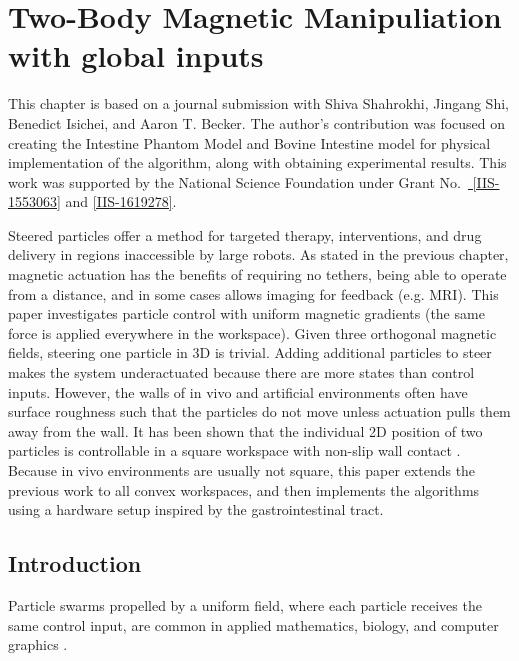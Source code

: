 \chapter[Two-Body Magnetic Manipulation with global inputs]{Two-Body Magnetic Manipuliation with global inputs}\label{chap-wallFriction}



This chapter is based on a journal submission with  Shiva Shahrokhi, Jingang Shi,  Benedict Isichei, and Aaron T. Becker.
The author's contribution was focused on creating the Intestine Phantom Model and Bovine Intestine model for physical implementation of the algorithm, along with obtaining experimental results. 
This work was supported by the National Science Foundation under Grant No.\ \href{http://nsf.gov/awardsearch/showAward?AWD_ID=1553063}{ [IIS-1553063]} and \href{http://nsf.gov/awardsearch/showAward?AWD_ID=1619278}{[IIS-1619278]}.


Steered particles offer a method for targeted therapy, interventions, and drug delivery in regions inaccessible by large robots.
As stated in the previous chapter, magnetic actuation has the benefits of requiring no tethers, being able to operate from a distance, and in some cases allows imaging for feedback (e.g. MRI).
This paper investigates particle control with uniform magnetic gradients (the same force is applied everywhere in the workspace).
Given three orthogonal magnetic fields, steering one particle in 3D is trivial. 
Adding additional particles to steer makes the system underactuated because there are more states than control inputs. 
However, the walls of in vivo and artificial environments often have surface roughness such that the particles do not move unless actuation pulls them away from the wall.
It has been shown that the individual 2D position of two particles is controllable in a square workspace with non-slip wall contact \cite{shahrokhi2017algorithms}.
Because in vivo environments are usually not square, this paper extends the previous work to all convex workspaces, and then implements the algorithms using a hardware setup inspired by the gastrointestinal tract.


\section{Introduction}\label{sec:Intro}
Particle swarms propelled by a uniform field, where each particle  receives the same control input, are common in applied mathematics, biology, and computer graphics \cite{Peyer2013,Shirai2005,Chiang2011}.



